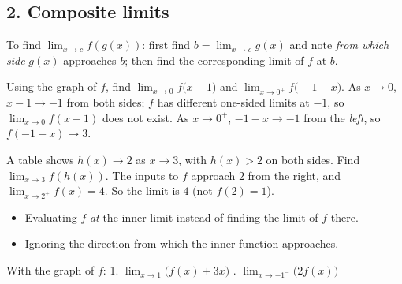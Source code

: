 \subsection*{2. Composite limits}
\begin{keyidea}
To find $\lim_{x\to c}f(g(x))$: first find $b=\lim_{x\to c}g(x)$ and note \emph{from which side} $g(x)$ approaches $b$; then find the corresponding limit of $f$ at $b$.
\end{keyidea}

\begin{example}[Example 2]
Using the graph of $f$, find $\displaystyle\lim_{x\to0}f\big(x-1\big)$ and $\displaystyle\lim_{x\to0^+}f\big(-1-x\big)$.
\sol As $x\to0$, $x-1\to-1$ from both sides; $f$ has different one-sided limits at $-1$, so $\lim_{x\to0}f(x-1)$ does not exist. As $x\to0^+$, $-1-x\to-1$ from the \emph{left}, so $f(-1-x)\to3$.
\end{example}

\begin{example}
A table shows $h(x)\to2$ as $x\to3$, with $h(x)>2$ on both sides. Find $\lim_{x\to3}f(h(x))$.
\sol The inputs to $f$ approach $2$ from the right, and $\lim_{x\to2^+}f(x)=4$. So the limit is $4$ (not $f(2)=1$).
\end{example}

\begin{mistakes}
\begin{itemize}
\item Evaluating $f$ \emph{at} the inner limit instead of finding the limit of $f$ there.
\item Ignoring the direction from which the inner function approaches.
\end{itemize}
\end{mistakes}

\begin{quickcheck}
With the graph of $f$: 1. $\lim_{x\to1}\big(f(x)+3x\big)$ . $\lim_{x\to-1^-}\big(2f(x)\big)$
\end{quickcheck}


